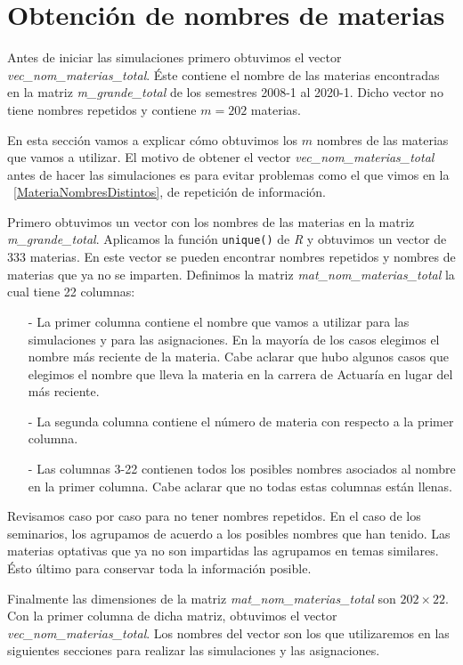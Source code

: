 \section{Obtención de nombres de materias}

Antes de iniciar las simulaciones primero obtuvimos el vector \textit{vec\_nom\_materias\_total}. Éste contiene el nombre de las materias encontradas en la matriz \textit{m\_grande\_total} de los semestres 2008-1 al 2020-1. Dicho vector  no tiene nombres repetidos y contiene $m = 202$ materias.

En esta sección vamos a explicar cómo obtuvimos los $m$ nombres de las materias que vamos a utilizar. El motivo de obtener el vector \textit{vec\_nom\_materias\_total} antes de hacer las simulaciones es para evitar problemas como el que vimos en la \figurename{~\ref{MateriaNombresDistintos}}, de repetición de información.

Primero obtuvimos un vector con los nombres de las materias en la matriz \textit{m\_grande\_total}. Aplicamos la función \verb+unique()+ de \textit{R} y obtuvimos un vector de 333 materias. En este vector se pueden encontrar nombres repetidos y nombres de materias que ya no se imparten. Definimos la matriz \textit{mat\_nom\_materias\_total} la cual tiene 22 columnas:

\begin{itemize}
\item[-] La primer columna contiene el nombre que vamos a utilizar para las simulaciones y para las asignaciones. En la mayoría de los casos elegimos el nombre más reciente de la materia. Cabe aclarar que hubo algunos casos que elegimos el nombre que lleva la materia en la carrera de Actuaría en lugar del más reciente.

\item[-] La segunda columna contiene el número de materia con respecto a la primer columna.

\item[-] Las columnas 3-22 contienen todos los posibles nombres asociados al nombre en la primer columna. Cabe aclarar que no todas estas columnas están llenas.
\end{itemize}

Revisamos caso por caso para no tener nombres repetidos. En el caso de los seminarios, los agrupamos de acuerdo a los posibles nombres que han tenido. Las materias optativas que ya no son impartidas las agrupamos en temas similares. Ésto último para conservar toda la información posible. %

Finalmente las dimensiones de la matriz \textit{mat\_nom\_materias\_total} son $202 \times 22$. Con la primer columna de dicha matriz, obtuvimos el vector \textit{vec\_nom\_materias\_total}. Los nombres del vector son los que utilizaremos en las siguientes secciones para realizar las simulaciones y las asignaciones.
